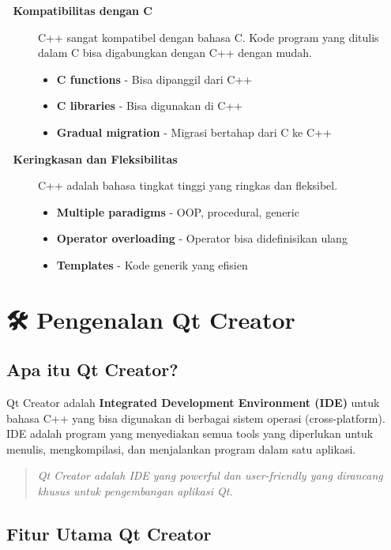 \begin{description}
\item[🔄 \textbf{Kompatibilitas dengan C}]
C++ sangat kompatibel dengan bahasa C. Kode program yang ditulis dalam C bisa digabungkan dengan C++ dengan mudah.

\begin{itemize}
\item \textbf{C functions} - Bisa dipanggil dari C++
\item \textbf{C libraries} - Bisa digunakan di C++
\item \textbf{Gradual migration} - Migrasi bertahap dari C ke C++
\end{itemize}

\item[📝 \textbf{Keringkasan dan Fleksibilitas}]
C++ adalah bahasa tingkat tinggi yang ringkas dan fleksibel.

\begin{itemize}
\item \textbf{Multiple paradigms} - OOP, procedural, generic
\item \textbf{Operator overloading} - Operator bisa didefinisikan ulang
\item \textbf{Templates} - Kode generik yang efisien
\end{itemize}

\end{description}

\section{🛠️ Pengenalan Qt Creator}

\subsection{Apa itu Qt Creator?}

Qt Creator adalah \textbf{Integrated Development Environment (IDE)} untuk bahasa C++ yang bisa digunakan di berbagai sistem operasi (cross-platform). IDE adalah program yang menyediakan semua tools yang diperlukan untuk menulis, mengkompilasi, dan menjalankan program dalam satu aplikasi.

\begin{quote}
\textit{Qt Creator adalah IDE yang powerful dan user-friendly yang dirancang khusus untuk pengembangan aplikasi Qt.}
\end{quote}

\subsection{Fitur Utama Qt Creator}

